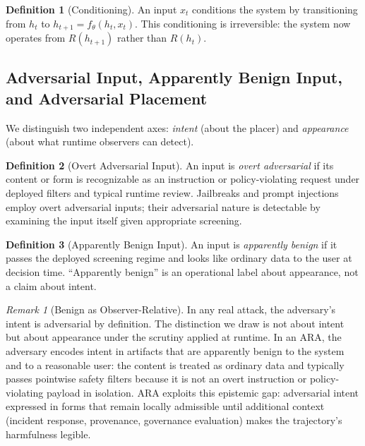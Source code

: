 \documentclass[11pt]{article}
\theoremstyle{definition}
\newtheorem{definition}{Definition}[section]
\theoremstyle{plain}
\theoremstyle{remark}
\newtheorem{remark}{Remark}[section]
\begin{document}
\begin{definition}[Conditioning]
An input $x_t$ conditions the system by transitioning from $h_t$ to $h_{t+1} = f_\theta(h_t, x_t)$. This conditioning is irreversible: the system now operates from $R(h_{t+1})$ rather than $R(h_t)$.
\end{definition}

\subsection{Adversarial Input, Apparently Benign Input, and Adversarial Placement}

We distinguish two independent axes: \emph{intent} (about the placer) and \emph{appearance} (about what runtime observers can detect).

\begin{definition}[Overt Adversarial Input]
\label{def:adversarial}
An input is \emph{overt adversarial} if its content or form is recognizable as an instruction or policy-violating request under deployed filters and typical runtime review. Jailbreaks and prompt injections employ overt adversarial inputs; their adversarial nature is detectable by examining the input itself given appropriate screening.
\end{definition}

\begin{definition}[Apparently Benign Input]
An input is \emph{apparently benign} if it passes the deployed screening regime and looks like ordinary data to the user at decision time. ``Apparently benign'' is an operational label about appearance, not a claim about intent.
\end{definition}

\begin{remark}[Benign as Observer-Relative]
In any real attack, the adversary's intent is adversarial by definition. The distinction we draw is not about intent but about appearance under the scrutiny applied at runtime. In an ARA, the adversary encodes intent in artifacts that are apparently benign to the system and to a reasonable user: the content is treated as ordinary data and typically passes pointwise safety filters because it is not an overt instruction or policy-violating payload in isolation. ARA exploits this epistemic gap: adversarial intent expressed in forms that remain locally admissible until additional context (incident response, provenance, governance evaluation) makes the trajectory's harmfulness legible.
\end{remark}
\end{document}
